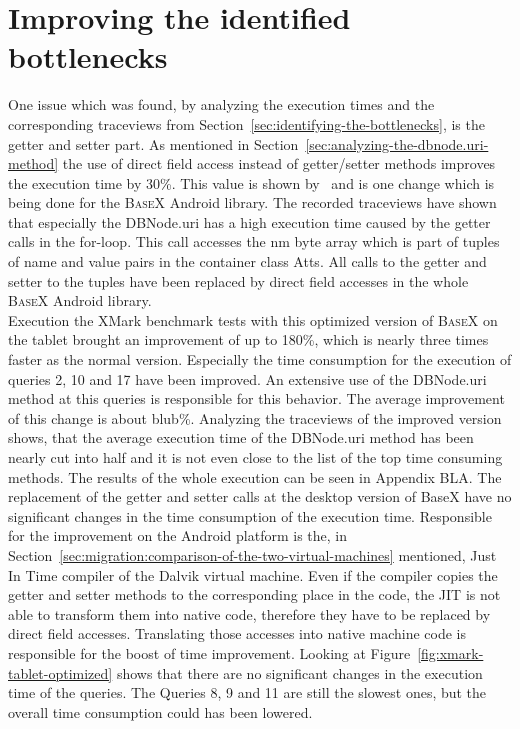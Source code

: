 \section{Improving the identified bottlenecks}
\label{sec:improving}
One issue which was found, by analyzing the execution times and the corresponding traceviews from Section~\ref{sec:identifying-the-bottlenecks}, is the getter and setter part.
As mentioned in Section~\ref{sec:analyzing-the-dbnode.uri-method} the use of direct field access instead of getter/setter methods improves the execution time by 30\%.
This value is shown by~\cite{toninievlautatingandroid} and is one change which is being done for the \textsc{BaseX} Android library.
The recorded traceviews have shown that especially the \textsf{DBNode.uri} has a high execution time caused by the getter calls in the for-loop.
This call accesses the \textsf{nm} byte array which is part of tuples of name and value pairs in the container class \textsf{Atts}.
All calls to the getter and setter to the tuples have been replaced by direct field accesses in the whole \textsc{BaseX} Android library.\\
Execution the XMark benchmark tests with this optimized version of \textsc{BaseX} on the tablet brought an improvement of up to 180\%, which is nearly three times faster as the normal version.
Especially the time consumption for the execution of queries 2, 10 and 17 have been improved.
An extensive use of the \textsf{DBNode.uri} method at this queries is responsible for this behavior.
The average improvement of this change is about blub\%.
Analyzing the traceviews of the improved version shows, that the average execution time of the \textsf{DBNode.uri} method has been nearly cut into half and it is not even close to the list of the top time consuming methods.
The results of the whole execution can be seen in Appendix BLA.
The replacement of the getter and setter calls at the desktop version of \textsf{BaseX} have no significant changes in the time consumption of the execution time.
Responsible for the improvement on the Android platform is the, in Section~\ref{sec:migration:comparison-of-the-two-virtual-machines} mentioned, Just In Time compiler of the Dalvik virtual machine. 
Even if the compiler copies the getter and setter methods to the corresponding place in the code, the JIT is not able to transform them into native code, therefore they have to be replaced by direct field accesses.
Translating those accesses into native machine code is responsible for the boost of time improvement.
Looking at Figure~\ref{fig:xmark-tablet-optimized} shows that there are no significant changes in the execution time of the queries.
The Queries 8, 9 and 11 are still the slowest ones, but the overall time consumption could has been lowered.

